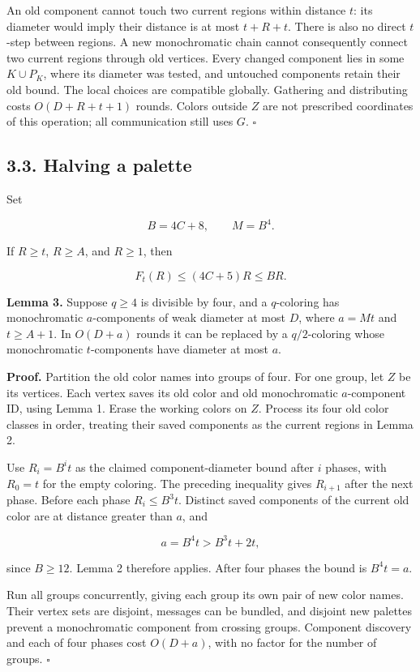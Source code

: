 \documentclass[11pt,a4paper]{article}
\begin{document}
An old component cannot touch two current regions within distance \(t\): its diameter would imply their distance is at most \(t+R+t\).
There is also no direct \(t\)-step between regions.
A new monochromatic chain cannot consequently connect two current regions through old vertices.
Every changed component lies in some \(K\cup P_K\), where its diameter was tested, and untouched components retain their old bound.
The local choices are compatible globally.
Gathering and distributing costs \(O(D+R+t+1)\) rounds.
Colors outside \(Z\) are not prescribed coordinates of this operation; all communication still uses \(G\). \(\square\)

\subsection{3.3. Halving a palette}\label{halving-a-palette}

Set

\[ B=4C+8,\qquad M=B^4. \]

If \(R\ge t\), \(R\ge A\), and \(R\ge1\), then

\[ F_t(R)\le(4C+5)R\le BR. \]

\textbf{Lemma 3.} Suppose \(q\ge4\) is divisible by four, and a \(q\)-coloring has monochromatic \(a\)-components of weak diameter at most \(D\), where \(a=Mt\) and \(t\ge A+1\).
In \(O(D+a)\) rounds it can be replaced by a \(q/2\)-coloring whose monochromatic \(t\)-components have diameter at most \(a\).

\textbf{Proof.} Partition the old color names into groups of four.
For one group, let \(Z\) be its vertices.
Each vertex saves its old color and old monochromatic \(a\)-component ID, using Lemma 1.
Erase the working colors on \(Z\).
Process its four old color classes in order, treating their saved components as the current regions in Lemma 2.

Use \(R_i=B^it\) as the claimed component-diameter bound after \(i\) phases, with \(R_0=t\) for the empty coloring.
The preceding inequality gives \(R_{i+1}\) after the next phase.
Before each phase \(R_i\le B^3t\).
Distinct saved components of the current old color are at distance greater than \(a\), and

\[ a=B^4t>B^3t+2t, \]

since \(B\ge12\).
Lemma 2 therefore applies.
After four phases the bound is \(B^4t=a\).

Run all groups concurrently, giving each group its own pair of new color names.
Their vertex sets are disjoint, messages can be bundled, and disjoint new palettes prevent a monochromatic component from crossing groups.
Component discovery and each of four phases cost \(O(D+a)\), with no factor for the number of groups. \(\square\)
\end{document}
